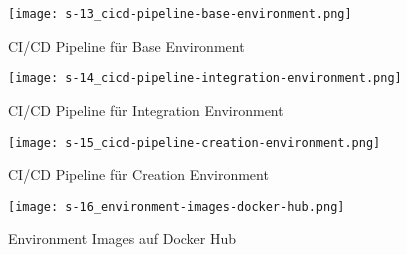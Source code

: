 \begin{figure}[hp]
    \centering
    \texttt{[image: s-13\_cicd-pipeline-base-environment.png]}
    \caption{CI/CD Pipeline für Base Environment}
    \label{fig:s-13_cicd-pipeline-base-environment}

    \vfil
    
    \texttt{[image: s-14\_cicd-pipeline-integration-environment.png]}
    \caption{CI/CD Pipeline für Integration Environment}
    \label{fig:s-14_cicd-pipeline-integration-environment}

    \vfil

    \texttt{[image: s-15\_cicd-pipeline-creation-environment.png]}
    \caption{CI/CD Pipeline für Creation Environment}
    \label{fig:s-15_cicd-pipeline-creation-environment}
\end{figure}

\begin{figure}[hp]
    \centering
    \texttt{[image: s-16\_environment-images-docker-hub.png]}
    \caption{Environment Images auf Docker Hub}
    \label{fig:s-16_environment-images-docker-hub}
\end{figure}
